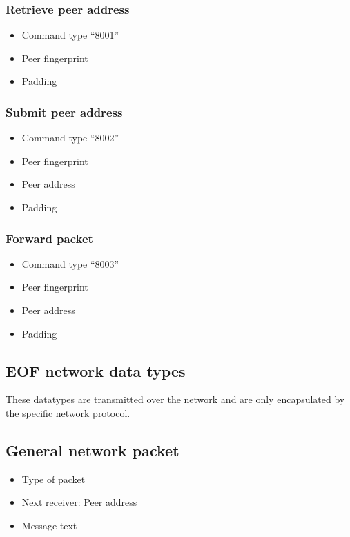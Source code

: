 \documentclass[12pt,a4paper]{book}
\begin{document}
\subsubsection{Retrieve peer address}
\begin{itemize}
\item Command type "`8001"'
\item Peer fingerprint
\item Padding
\end{itemize}
\subsubsection{Submit peer address}
\begin{itemize}
\item Command type "`8002"'
\item Peer fingerprint
\item Peer address
\item Padding
\end{itemize}
\subsubsection{Forward packet}
\begin{itemize}
\item Command type "`8003"'
\item Peer fingerprint
\item Peer address
\item Padding
\end{itemize}
\subsection{EOF network data types}
These datatypes are transmitted over the network and are only
encapsulated by the specific network protocol.
\subsection{General network packet}
\begin{itemize}
\item Type of packet
\item Next receiver: Peer address
\item Message text
\end{itemize}
\end{document}

